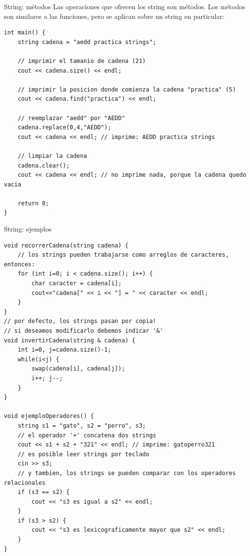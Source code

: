 \documentclass[12pt]{beamer}
\begin{document}
\begin{frame}[fragile]{String: métodos}
    Las operaciones que ofrecen los \alert{string} son métodos. Los métodos son similares a las funciones, pero se aplican sobre un string en particular:

\begin{lstlisting}[basicstyle=\tiny]
int main() {
    string cadena = "aedd practica strings";

    // imprimir el tamanio de cadena (21)
    cout << cadena.size() << endl;

    // imprimir la posicion donde comienza la cadena "practica" (5)
    cout << cadena.find("practica") << endl;

    // reemplazar "aedd" por "AEDD"
    cadena.replace(0,4,"AEDD");
    cout << cadena << endl; // imprime: AEDD practica strings

    // limpiar la cadena
    cadena.clear();
    cout << cadena << endl; // no imprime nada, porque la cadena quedo vacia
   
    return 0;
}
\end{lstlisting}
\end{frame}

\begin{frame}[fragile]{String: ejemplos}
\begin{lstlisting}[basicstyle=\tiny]
void recorrerCadena(string cadena) {
    // los strings pueden trabajarse como arreglos de caracteres, entonces:
    for (int i=0; i < cadena.size(); i++) {
        char caracter = cadena[i];
        cout<<"cadena[" << i << "] = " << caracter << endl;
    }
}
// por defecto, los strings pasan por copia!
// si deseamos modificarlo debemos indicar '&'
void invertirCadena(string & cadena) {
    int i=0, j=cadena.size()-1;
    while(i<j) {
        swap(cadena[i], cadena[j]);
        i++; j--;
    }
}

void ejemploOperadores() {
    string s1 = "gato", s2 = "perro", s3;
    // el operador '+' concatena dos strings
    cout << s1 + s2 + "321" << endl; // imprime: gatoperro321
    // es posible leer strings por teclado
    cin >> s3;
    // y tambien, los strings se pueden comparar con los operadores relacionales
    if (s3 == s2) {
        cout << "s3 es igual a s2" << endl;
    }
    if (s3 > s2) {
        cout << "s3 es lexicograficamente mayor que s2" << endl;
    }
}
\end{lstlisting}
\end{frame}
\end{document}
